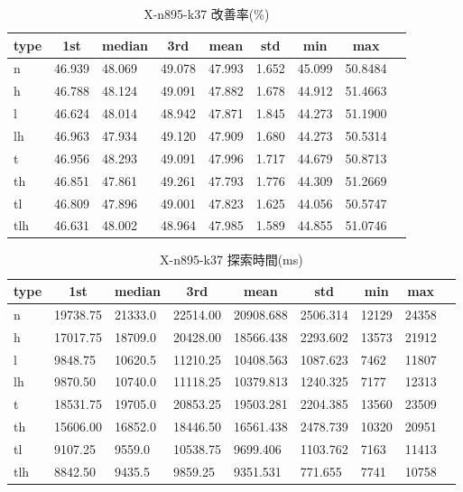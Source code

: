 \begin{table}[htbp]
    \caption{X-n895-k37 改善率(\%)}
    \begin{tabular}{|l|l|l|l|l|l|l|l|l|}\hline
    \multicolumn{1}{|c|}{\textbf{type}}
    &\multicolumn{1}{|c|}{\textbf{1st}}
    &\multicolumn{1}{c|}{\textbf{median}}
    &\multicolumn{1}{c|}{\textbf{3rd}}
    &\multicolumn{1}{c|}{\textbf{mean}}
    &\multicolumn{1}{c|}{\textbf{std}}
    &\multicolumn{1}{c|}{\textbf{min}}
    &\multicolumn{1}{c|}{\textbf{max}}\\\hline
	n & 46.939 & 48.069 & 49.078 & 47.993 & 1.652 & 45.099 & 50.8484\\\hline
	h & 46.788 & 48.124 & 49.091 & 47.882 & 1.678 & 44.912 & 51.4663\\\hline
	l & 46.624 & 48.014 & 48.942 & 47.871 & 1.845 & 44.273 & 51.1900\\\hline
	lh & 46.963 & 47.934 & 49.120 & 47.909 & 1.680 & 44.273 & 50.5314\\\hline
	t & 46.956 & 48.293 & 49.091 & 47.996 & 1.717 & 44.679 & 50.8713\\\hline
	th & 46.851 & 47.861 & 49.261 & 47.793 & 1.776 & 44.309 & 51.2669\\\hline
	tl & 46.809 & 47.896 & 49.001 & 47.823 & 1.625 & 44.056 & 50.5747\\\hline
	tlh & 46.631 & 48.002 & 48.964 & 47.985 & 1.589 & 44.855 & 51.0746\\\hline
	\end{tabular}
\end{table}
\begin{table}[htbp]
    \caption{X-n895-k37 探索時間(ms)}
    \begin{tabular}{|l|l|l|l|l|l|l|l|l|}\hline
    \multicolumn{1}{|c|}{\textbf{type}}
    &\multicolumn{1}{|c|}{\textbf{1st}}
    &\multicolumn{1}{c|}{\textbf{median}}
    &\multicolumn{1}{c|}{\textbf{3rd}}
    &\multicolumn{1}{c|}{\textbf{mean}}
    &\multicolumn{1}{c|}{\textbf{std}}
    &\multicolumn{1}{c|}{\textbf{min}}
    &\multicolumn{1}{c|}{\textbf{max}}\\\hline
	n & 19738.75 & 21333.0 & 22514.00 & 20908.688 & 2506.314 & 12129 & 24358\\\hline
	h & 17017.75 & 18709.0 & 20428.00 & 18566.438 & 2293.602 & 13573 & 21912\\\hline
	l & 9848.75 & 10620.5 & 11210.25 & 10408.563 & 1087.623 & 7462 & 11807\\\hline
	lh & 9870.50 & 10740.0 & 11118.25 & 10379.813 & 1240.325 & 7177 & 12313\\\hline
	t & 18531.75 & 19705.0 & 20853.25 & 19503.281 & 2204.385 & 13560 & 23509\\\hline
	th & 15606.00 & 16852.0 & 18446.50 & 16561.438 & 2478.739 & 10320 & 20951\\\hline
	tl & 9107.25 & 9559.0 & 10538.75 & 9699.406 & 1103.762 & 7163 & 11413\\\hline
	tlh & 8842.50 & 9435.5 & 9859.25 & 9351.531 & 771.655 & 7741 & 10758\\\hline
	\end{tabular}
\end{table}

